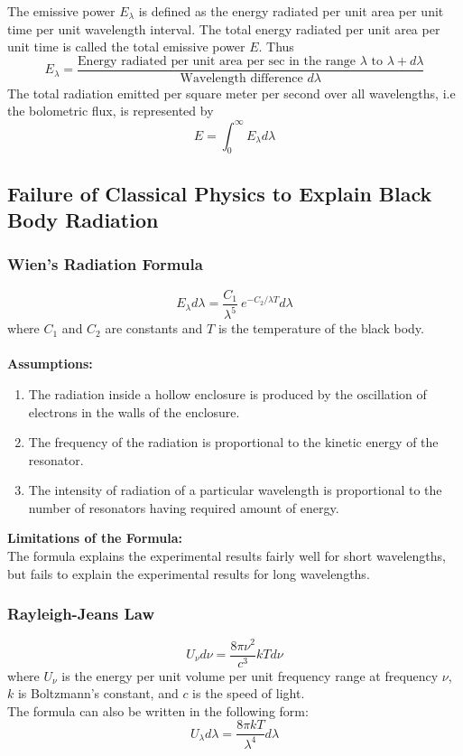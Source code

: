 \documentclass[12pt]{article}
\numberwithin{equation}{subsection}
\begin{document}
The emissive power $E_{\lambda}$ is defined as the energy radiated per unit area per unit time per unit wavelength interval. The total energy radiated per unit area per unit time is called the total emissive power $E$. Thus \[
    E_{\lambda} = \frac{\text{Energy radiated per unit area per sec in the range $\lambda$ to $\lambda+d\lambda$}}{\text{Wavelength difference $d\lambda$}}
\]
The total radiation emitted per square meter per second over all wavelengths, i.e the bolometric flux, is represented by \[
    E = \int_{0}^{\infty} E_{\lambda} d\lambda
\]

\subsection{Failure of Classical Physics to Explain Black Body Radiation}

\subsubsection{Wien's Radiation Formula}
\begin{equation}
    E_{\lambda} d\lambda = \frac{C_1}{\lambda^5} \: e^{-C_2/\lambda T} d\lambda
\end{equation}
where $C_1$ and $C_2$ are constants and $T$ is the temperature of the black body. \\~\\

\textbf{Assumptions:} \\
\begin{enumerate}
    \item The radiation inside a hollow enclosure is produced by the oscillation of electrons in the walls of the enclosure.
    \item The frequency of the radiation is proportional to the kinetic energy of the resonator.
    \item The intensity of radiation of a particular wavelength is proportional to the number of resonators having required amount of energy.
    
\end{enumerate}

\textbf{Limitations of the Formula:} \\
The formula explains the experimental results fairly well for short wavelengths, but fails to explain the experimental results for long wavelengths.


\subsubsection{Rayleigh-Jeans Law}
\begin{equation}
    U_{\nu} d\nu = \frac{8\pi\nu^2}{c^3} kT d\nu
\end{equation}
where $U_{\nu}$ is the energy per unit volume per unit frequency range at frequency $\nu$, $k$ is Boltzmann's constant, and $c$ is the speed of light.\\
The formula can also be written in the following form:
\begin{equation}
    U_{\lambda} d\lambda = \frac{8\pi kT}{\lambda^4} d\lambda
\end{equation}
\end{document}
